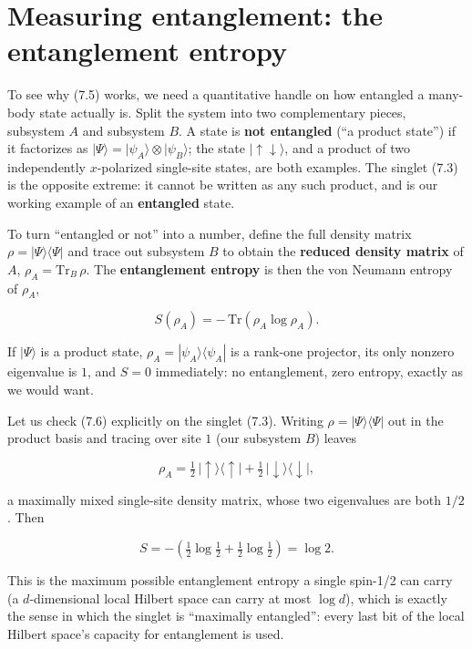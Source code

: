\section{Measuring entanglement: the entanglement entropy}

To see why (7.5) works, we need a quantitative handle on how entangled a many-body state actually is.
Split the system into two complementary pieces, subsystem $A$ and subsystem $B$. A state is \textbf{not
entangled} (``a product state'') if it factorizes as $|\Psi\rangle = |\psi_A\rangle \otimes
|\psi_B\rangle$; the state $|{\uparrow\downarrow}\rangle$, and a product of two independently
$x$-polarized single-site states, are both examples. The singlet (7.3) is the opposite extreme: it
cannot be written as any such product, and is our working example of an \textbf{entangled} state.

To turn ``entangled or not'' into a number, define the full density matrix $\rho = |\Psi\rangle
\langle\Psi|$ and trace out subsystem $B$ to obtain the \textbf{reduced density matrix} of $A$, $\rho_A =
\mathrm{Tr}_B\,\rho$. The \textbf{entanglement entropy} is then the von Neumann entropy of $\rho_A$,

\begin{equation}
S(\rho_A) = -\,\mathrm{Tr}\!\left(\rho_A \log \rho_A\right).
\end{equation}

If $|\Psi\rangle$ is a product state, $\rho_A = |\psi_A\rangle\langle\psi_A|$ is a rank-one projector,
its only nonzero eigenvalue is $1$, and $S=0$ immediately: no entanglement, zero entropy, exactly as we
would want.

Let us check (7.6) explicitly on the singlet (7.3). Writing $\rho = |\Psi\rangle\langle\Psi|$ out in
the product basis and tracing over site $1$ (our subsystem $B$) leaves

\begin{equation*}
\rho_A = \tfrac{1}{2}\,|{\uparrow}\rangle\langle{\uparrow}| + \tfrac{1}{2}\,
|{\downarrow}\rangle\langle{\downarrow}|,
\end{equation*}

a maximally mixed single-site density matrix, whose two eigenvalues are both $1/2$. Then

\begin{equation}
S = -\left(\tfrac12\log\tfrac12 + \tfrac12\log\tfrac12\right) = \log 2.
\end{equation}

This is the maximum possible entanglement entropy a single spin-1/2 can carry (a $d$-dimensional local
Hilbert space can carry at most $\log d$), which is exactly the sense in which the singlet is ``maximally
entangled'': every last bit of the local Hilbert space's capacity for entanglement is used.

